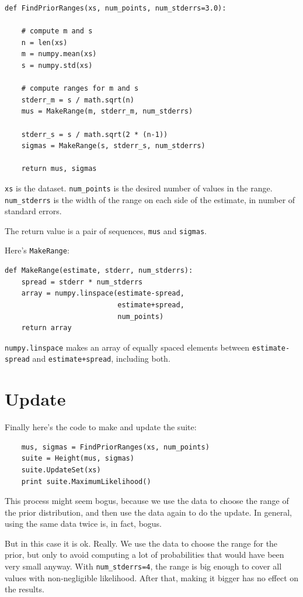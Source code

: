 \documentclass[12pt]{book}
\begin{document}
\begin{verbatim}
def FindPriorRanges(xs, num_points, num_stderrs=3.0):

    # compute m and s
    n = len(xs)
    m = numpy.mean(xs)
    s = numpy.std(xs)

    # compute ranges for m and s
    stderr_m = s / math.sqrt(n)
    mus = MakeRange(m, stderr_m, num_stderrs)

    stderr_s = s / math.sqrt(2 * (n-1))
    sigmas = MakeRange(s, stderr_s, num_stderrs)

    return mus, sigmas
\end{verbatim}

{\tt xs} is the dataset.  \verb"num_points" is the desired number of
values in the range.  \verb"num_stderrs" is the width of the range on
each side of the estimate, in number of standard errors.

The return
value is a pair of sequences, {\tt mus} and {\tt sigmas}.

Here's {\tt MakeRange}:

\begin{verbatim}
def MakeRange(estimate, stderr, num_stderrs):
    spread = stderr * num_stderrs
    array = numpy.linspace(estimate-spread,
                           estimate+spread,
                           num_points)
    return array
\end{verbatim}

{\tt numpy.linspace} makes an array of equally spaced elements between
{\tt estimate-spread} and {\tt estimate+spread}, including both.


\section{Update}

Finally here's the code to make and update the suite:

\begin{verbatim}
    mus, sigmas = FindPriorRanges(xs, num_points)
    suite = Height(mus, sigmas)
    suite.UpdateSet(xs)
    print suite.MaximumLikelihood()    
\end{verbatim}

This process might seem bogus, because we use the data to choose the
range of the prior distribution, and then use the data again to do the
update.  In general, using the same data twice is, in fact, bogus.

But in this case it is ok.  Really.  We use the data to choose the
range for the prior, but only to avoid computing a lot of
probabilities that would have been very small anyway.  With
\verb"num_stderrs=4", the range is big enough to cover all values with
non-negligible likelihood.  After that, making it bigger has no effect
on the results.
\end{document}
